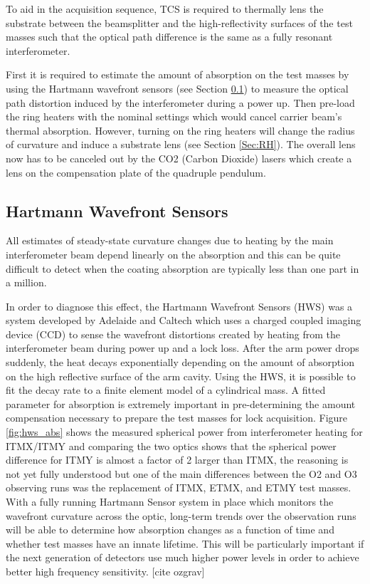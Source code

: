 	To aid in the acquisition sequence, TCS is required to thermally lens the substrate between the beamsplitter and the high-reflectivity surfaces of the test masses such that the optical path difference is the same as a fully resonant interferometer.
	
	First it is required to estimate the amount of absorption on the test masses by using the Hartmann wavefront sensors (see Section \ref{Sec:HWS}) to measure the optical path distortion induced by the interferometer during a power up.  Then pre-load the ring heaters with the nominal settings which would cancel carrier beam's thermal absorption.  However, turning on the ring heaters will change the radius of curvature and induce a substrate lens (see Section \ref{Sec:RH}).  The overall lens now has to be canceled out by the CO2 (Carbon Dioxide) lasers which create a lens on the compensation plate of the quadruple pendulum.

	\subsection{Hartmann Wavefront Sensors}\label{Sec:HWS}
	All estimates of steady-state curvature changes due to heating by the main interferometer beam depend linearly on the absorption and this can be quite difficult to detect when the coating absorption are typically less than one part in a million.
	
	In order to diagnose this effect, the Hartmann Wavefront Sensors (HWS) \cite{Brooks_OffAxis} \cite{Veitch_HWS_ALIGO} was a system developed by Adelaide and Caltech \cite{Brooks_HWS_2007} \cite{Brooks_HWS_2009} which uses a charged coupled imaging device (CCD) to sense the wavefront distortions created by heating from the interferometer beam during power up and a lock loss.  After the arm power drops suddenly, the heat decays exponentially depending on the amount of absorption on the high reflective surface of the arm cavity.  Using the HWS, it is possible to fit the decay rate to a finite element model of a cylindrical mass.  A fitted parameter for absorption is extremely important in pre-determining the amount compensation necessary to prepare the test masses for lock acquisition.  Figure \ref{fig:hws_abs} shows the measured spherical power from interferometer heating for ITMX/ITMY and comparing the two optics shows that the spherical power difference for ITMY is almost a factor of 2 larger than ITMX, the reasoning is not yet fully understood but one of the main differences between the O2 and O3 observing runs was the replacement of ITMX, ETMX, and ETMY test masses.  With a fully running Hartmann Sensor system in place which monitors the wavefront curvature across the optic, long-term trends over the observation runs will be able to determine how absorption changes as a function of time and whether test masses have an innate lifetime.  This will be particularly important if the next generation of detectors use much higher power levels in order to achieve better high frequency sensitivity. [cite ozgrav]
	
